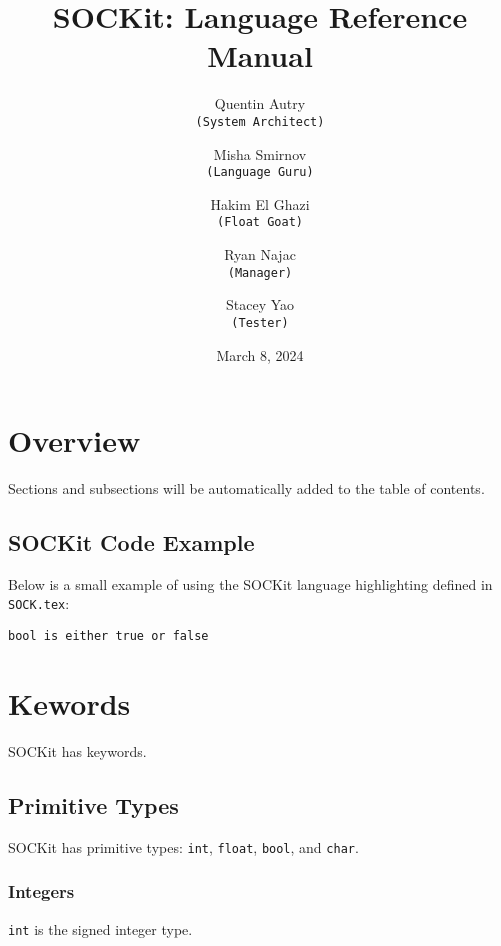 \documentclass[12pt,a4paper]{article}
\title{SOCKit: Language Reference Manual}
\author{
    Quentin Autry\\
        \texttt{(System Architect)} \and
    Misha Smirnov\\
        \texttt{(Language Guru)} \and
    Hakim El Ghazi\\
        \texttt{(Float Goat)} \and
    Ryan Najac\\
        \texttt{(Manager)} \and
    Stacey Yao\\
        \texttt{(Tester)}
}
\date{March 8, 2024}
\begin{document}
\maketitle
\newpage
\tableofcontents
\newpage

\section{Overview}
Sections and subsections will be automatically added to the table of contents.

\subsection{SOCKit Code Example}
Below is a small example of using the SOCKit language highlighting defined in \texttt{SOCK.tex}:

\begin{lstlisting}[language=SOCKit]
bool is either true or false
\end{lstlisting}

\section{Kewords}
SOCKit has keywords.

\subsection{Primitive Types}
SOCKit has primitive types: \texttt{int}, \texttt{float}, \texttt{bool}, and \texttt{char}.

\subsubsection{Integers}
\texttt{int} is the signed integer type.
\end{document}
